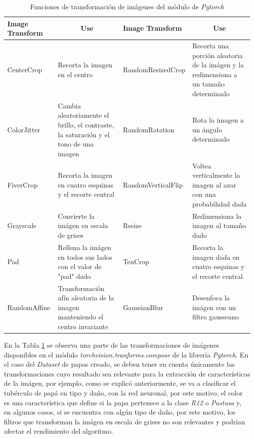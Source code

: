 			\begin{table}[ht]
				\centering
				\begin{tabular}{|p{3cm}|p{4cm}|p{3.8cm}|p{4cm}|}
					\hline
					Image Transform       & \multicolumn{1}{c|}{Use}                                                               & Image Transform       & \multicolumn{1}{c|}{Use}                                                                        \\ \hline
					CenterCrop            & Recorta la imagen en el centro                                                         & RandomResizedCrop     & Recorta una porción aleatoria de la imágen y la redimensiona a un tamaño determinado            \\ \hline
					ColorJitter           & Cambia aleatoriamente el brillo, el contraste, la saturación y el tono de una imagen   & RandomRotation        & Rota la imagen a un ángulo determinado                                                          \\ \hline
					FiverCrop              & Recorta la imagen en cuatro esquinas y el recorte central                              & RandomVerticalFlip    & Voltea verticalmente la imagen al azar con una probabilidad dada                                \\ \hline
					Grayscale             & Convierte la imágen en escala de grises                                                & Resize                & Redimensiona la imagen al tamaño dado                                                           \\ \hline
					Pad                   & Rellena la imágen en todos sus lados con el valor de "pad" dado                        & TenCrop               & Recorta la imagen dada en cuatro esquinas y el recorte central \\ \hline
					RandomAffine          & Transformación afín aleatoria de la imagen manteniendo el centro invariante            & GaussianBlur          & Desenfoca la imágen con un filtro gausseano                                                                                                                     \\ \hline
				\end{tabular}
				\caption{Funciones de transformación de imágenes del módulo de \textit{Pytorch}}
				\label{table:Filters1}
			\end{table}
			
			En la Tabla \ref{table:Filters1} se observa una parte de las transformaciones de imágenes disponibles en el módulo \textit{torchvision.tranforms.compose} de la librería \textit{Pytorch}. En el caso del \textit{Dataset} de papas creado, se deben tener en cuenta únicamente las transformaciones cuyo resultado sea relevante para la extracción de características de la imágen, por ejemplo, como se explicó anteriormente, se va a clasificar el tubérculo de papá en tipo y daño, con la red neuronal, por este motivo, el color es una característica que define si la papa pertenece a la clase \textit{R12} o \textit{Pastusa} y, en algunos casos, si se encuentra con algún tipo de daño, por este motivo, los filtros que transforman la imágen en escala de grises no son relevantes y podrían afectar el rendimiento del algoritmo.
		
